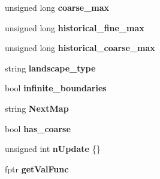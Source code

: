 \begin{DoxyCompactItemize}
\item 
unsigned long {\bfseries coarse\+\_\+max}\hypertarget{class_landscape_a4ce133d5e07e46f127bfa4f47597dcec}{}\label{class_landscape_a4ce133d5e07e46f127bfa4f47597dcec}

\item 
unsigned long {\bfseries historical\+\_\+fine\+\_\+max}\hypertarget{class_landscape_a86e67628c5ad3426f1f258e35ab5e4df}{}\label{class_landscape_a86e67628c5ad3426f1f258e35ab5e4df}

\item 
unsigned long {\bfseries historical\+\_\+coarse\+\_\+max}\hypertarget{class_landscape_aa79ae2cca59b135591c3cb978f14ee2a}{}\label{class_landscape_aa79ae2cca59b135591c3cb978f14ee2a}

\item 
string {\bfseries landscape\+\_\+type}\hypertarget{class_landscape_a2bed03fc250afab4f9341da6f1f6c0da}{}\label{class_landscape_a2bed03fc250afab4f9341da6f1f6c0da}

\item 
bool {\bfseries infinite\+\_\+boundaries}\hypertarget{class_landscape_ad4cf6ac6f87d0253d50b2738bb57087e}{}\label{class_landscape_ad4cf6ac6f87d0253d50b2738bb57087e}

\item 
string {\bfseries Next\+Map}\hypertarget{class_landscape_a7e16bed309816971071c17ad0ebf94e5}{}\label{class_landscape_a7e16bed309816971071c17ad0ebf94e5}

\item 
bool {\bfseries has\+\_\+coarse}\hypertarget{class_landscape_a0389b53426acd490ec77f94d9897f130}{}\label{class_landscape_a0389b53426acd490ec77f94d9897f130}

\item 
unsigned int {\bfseries n\+Update} \{\}\hypertarget{class_landscape_ae4830197a96ec263ee533b65aac8d2e6}{}\label{class_landscape_ae4830197a96ec263ee533b65aac8d2e6}

\item 
fptr {\bfseries get\+Val\+Func}\hypertarget{class_landscape_a3cca2f0650d5979668f2a22753f965b9}{}\label{class_landscape_a3cca2f0650d5979668f2a22753f965b9}

\end{DoxyCompactItemize}
